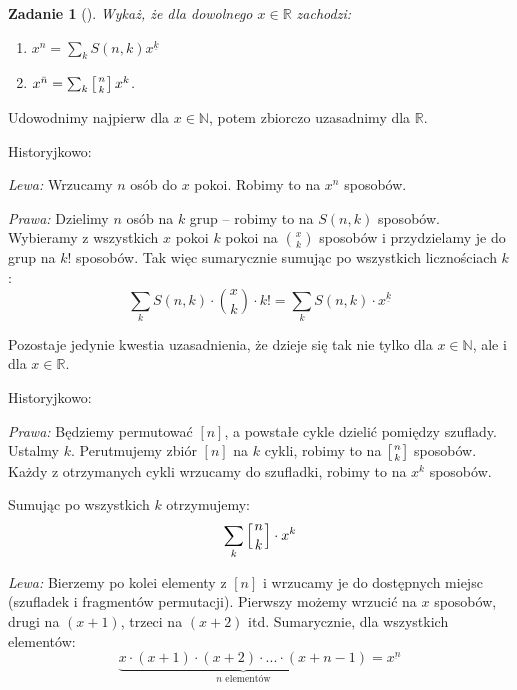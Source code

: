 \documentclass{mwbk}
\newtheorem{zad}{Zadanie}[chapter]
\begin{document}
\begin{zad}[]
    Wykaż, że dla dowolnego $x \in \mathbb{R}$ zachodzi:
    \begin{enumerate}
        \item $x^n = \sum_{k}S(n,k) x^{\underline{k}}$
        \item $x^{\bar{n}} = \sum_{k} \left[n \atop k \right] x^k$.
    \end{enumerate}
\end{zad}
\begin{mdframed}
    \begin{center} Udowodnimy najpierw dla $x \in \mathbb{N}$, potem zbiorczo uzasadnimy dla $\mathbb{R}$.\end{center}
    \begin{enumerate*}
        \item Historyjkowo:

              \textit{Lewa:}
              Wrzucamy $n$ osób do $x$ pokoi. Robimy to na $x^n$ sposobów.

              \textit{Prawa:}
              Dzielimy $n$ osób na $k$ grup -- robimy to na $S(n,k)$ sposobów.
              Wybieramy z wszystkich $x$ pokoi $k$ pokoi na $\binom{x}{k}$
              sposobów i przydzielamy je do grup na $k!$ sposobów.
              Tak więc sumarycznie sumując po wszystkich licznościach $k$:
              \[\sum_{k} S(n, k) \cdot \binom{x}{k} \cdot k! = \sum_{k} S(n, k) \cdot x^{\underline{k}} \]

              Pozostaje jedynie kwestia uzasadnienia, że dzieje się tak
              nie tylko dla $x \in \mathbb{N}$, ale i dla $x \in \mathbb{R}$. \newline


        \item Historyjkowo:

              \textit{Prawa:}
              Będziemy permutować $[n]$, a powstałe cykle dzielić pomiędzy szuflady.
              Ustalmy $k$. Perutmujemy zbiór $[n]$ na $k$ cykli, robimy to na $\left[n \atop k \right]$ sposobów.
              Każdy z otrzymanych cykli wrzucamy do szufladki, robimy to na $x^k$ sposobów.

              Sumując po wszystkich $k$ otrzymujemy:
              \[\sum_k \left[n \atop k \right] \cdot x^k\]

              \textit{Lewa:}
              Bierzemy po kolei elementy z $[n]$ i wrzucamy je do dostępnych miejsc (szufladek i fragmentów permutacji).
              Pierwszy możemy wrzucić na $x$ sposobów, drugi na $(x+1)$, trzeci na $(x+2)$ itd. Sumarycznie, dla wszystkich elementów:
              \[\underbrace{x \cdot (x+1) \cdot (x+2) \cdot ... \cdot (x + n - 1)}_{\text{$n$ elementów}} = x^{\underbar{n}}\] \newline


\end{enumerate*}
\end{mdframed}
\end{document}
